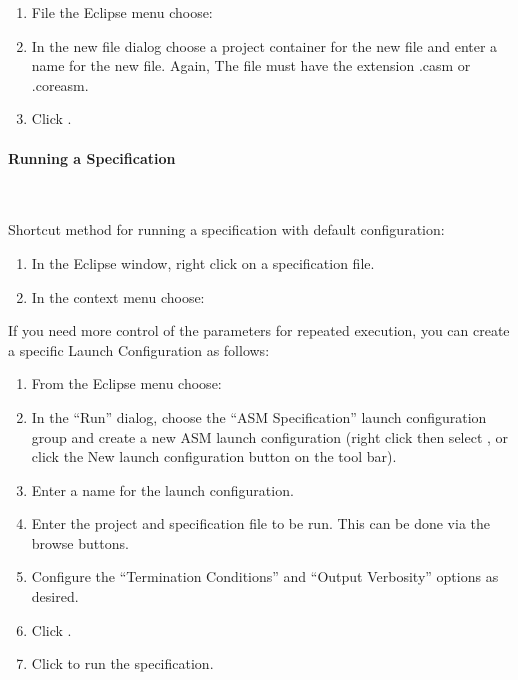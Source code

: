 \documentclass{article}
\begin{document}

\begin{enumerate}
    \item File the Eclipse menu choose: 
    \item In the new file dialog choose a project container for the new file and enter a name for the new file. Again, The file must have the extension {\ttfamily .casm} or {\ttfamily .coreasm}.
    \item Click . 
\end{enumerate}

\paragraph{Running a \CoreASM Specification} ~


Shortcut method for running a specification with default configuration:

\begin{enumerate}
    \item In the Eclipse window, right click on a \CoreASM specification file.
    \item In the context menu choose:  
\end{enumerate}


If you need more control of the parameters for repeated execution, 
you can create a specific \CoreASM Launch Configuration as follows:

\begin{enumerate}
    \item From the Eclipse menu choose: 
	\item In the ``Run'' dialog, choose the ``ASM Specification'' launch configuration
group and create a new ASM launch configuration (right click then select , or
click the New launch configuration button on the tool bar).
    \item Enter a name for the launch configuration.
    \item Enter the project and specification file to be run. This can be done via the browse buttons.
    \item Configure the ``Termination Conditions'' and ``Output Verbosity'' options as desired.
    \item Click .
    \item Click  to run the specification. 
\end{enumerate}
\end{document}
